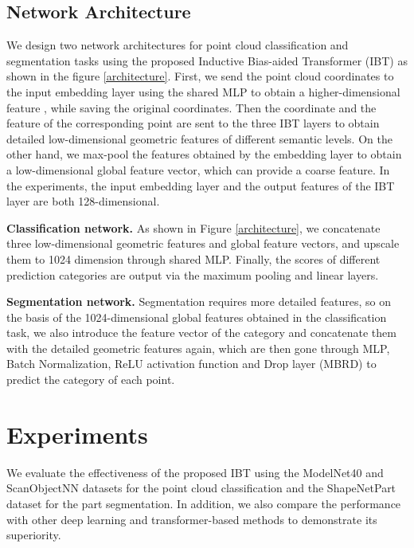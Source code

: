 \documentclass[conference]{IEEEtran}
\begin{document}
\subsection{Network Architecture} \vspace{-0.2cm} We design two network architectures for point cloud classification and segmentation tasks using the proposed Inductive Bias-aided Transformer (IBT) as shown in the figure \ref{architecture}. First, we send the point cloud coordinates to the input embedding layer using the shared MLP to obtain a higher-dimensional feature , while saving the original coordinates. Then the coordinate  and the feature  of the corresponding point are sent to the three IBT layers to obtain detailed low-dimensional geometric features of different semantic levels. On the other hand, we max-pool the features obtained by the embedding layer to obtain a low-dimensional global feature vector, which can provide a coarse feature. In the experiments, the input embedding layer and the output features of the IBT layer are both 128-dimensional.

{\bf Classification network.} As shown in Figure \ref{architecture}, we concatenate three low-dimensional geometric features and global feature vectors, and upscale them to 1024 dimension through shared MLP. Finally, the scores of different prediction categories are output via the maximum pooling and linear layers.

{\bf Segmentation network.} Segmentation requires more detailed features, so on the basis of the 1024-dimensional global features obtained in the classification task, we also introduce the feature vector of the category and concatenate them with the detailed geometric features again, which are then gone through MLP, Batch Normalization, ReLU activation function and Drop layer (MBRD) to predict the category of each point.



\vspace{-0.2cm}
\section{Experiments}
\vspace{-0.2cm}
 We evaluate the effectiveness of the proposed IBT  using the ModelNet40 \cite{wu20153d} and ScanObjectNN\cite{uy2019revisiting} datasets for the point cloud classification and the ShapeNetPart \cite{yi2016scalable} dataset for the part segmentation. In addition, we also compare the performance with other deep learning and transformer-based methods to demonstrate its superiority.
\end{document}
